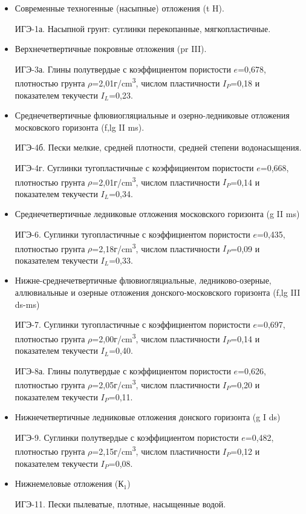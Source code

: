 \begin{itemize}
    \item  Современные техногенные (насыпные) отложения (t H).
    
    ИГЭ-1а. Насыпной грунт: суглинки перекопанные, мягкопластичные.

    \item Верхнечетвертичные покровные отложения (pr III).
    
    ИГЭ-3а. Глины полутвердые с коэффициентом пористости $e$=0,678, 
    плотностью грунта $\rho$=2,01г/\si{\centi\meter^3}, числом пластичности $I_P$=0,18 и 
    показателем текучести $I_L$=0,23.

    \item Среднечетвертичные флювиогляциальные и озерно-ледниковые отложения московского горизонта (f,lg II ms).
    
    ИГЭ-4б. Пески мелкие, средней плотности, средней степени водонасыщения.

    ИГЭ-4г. Суглинки тугопластичные с коэффициентом пористости $e$=0,668, 
    плотностью грунта $\rho$=2,01г/\si{\centi\meter^3}, числом пластичности $I_P$=0,14 и 
    показателем текучести $I_L$=0,34.

    \item Среднечетвертичные ледниковые отложения московского горизонта (g II ms)
    
    ИГЭ-6. Суглинки тугопластичные с коэффициентом пористости $e$=0,435, 
    плотностью грунта $\rho$=2,18г/\si{\centi\meter^3}, числом пластичности $I_P$=0,09 и показателем текучести $I_L$=0,33.

    \item Нижне-среднечетвертичные флювиогляциальные, ледниково-озерные, 
    аллювиальные и озерные отложения донского-московского горизонта (f,lg III ds-ms)

    ИГЭ-7. Суглинки тугопластичные с коэффициентом пористости $e$=0,697, 
    плотностью грунта $\rho$=2,00г/\si{\centi\meter^3}, числом пластичности $I_P$=0,14 и показателем текучести $I_L$=0,40. 

    ИГЭ-8а. Глины полутвердые с коэффициентом пористости $e$=0,626, 
    плотностью грунта $\rho$=2,05г/\si{\centi\meter^3}, числом пластичности $I_P$=0,20 и показателем текучести $I_P$=0,11.

    \item Нижнечетвертичные ледниковые отложения донского горизонта (g I ds)
    
    ИГЭ-9. Суглинки полутвердые с коэффициентом пористости $e$=0,482, 
    плотностью грунта $\rho$=2,15г/\si{\centi\meter^3}, числом пластичности $I_P$=0,12 и показателем текучести $I_P$=0,08.

    \item Нижнемеловые отложения ($К_1$)
    
    ИГЭ-11. Пески пылеватые, плотные, насыщенные водой.

\end{itemize}